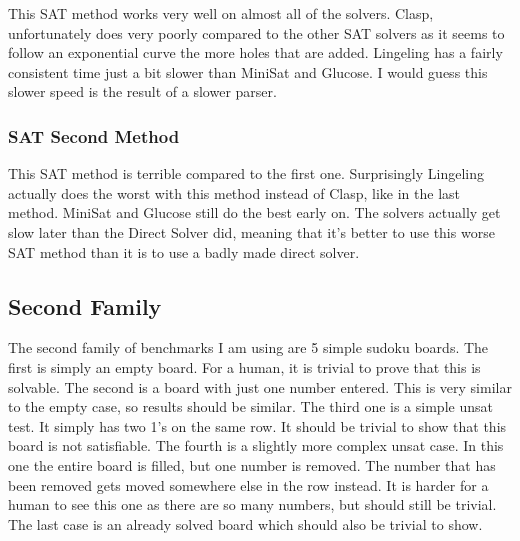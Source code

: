 \documentclass[11pt]{article} %
\begin{document}
This SAT method works very well on almost all of the solvers. Clasp, unfortunately does very poorly compared to the other SAT solvers as it seems to follow an exponential curve the more holes that are added. Lingeling has a fairly consistent time just a bit slower than MiniSat and Glucose. I would guess this slower speed is the result of a slower parser.

\subsubsection{SAT Second Method}

This SAT method is terrible compared to the first one. Surprisingly Lingeling actually does the worst with this method instead of Clasp, like in the last method. MiniSat and Glucose still do the best early on. The solvers actually get slow later than the Direct Solver did, meaning that it's better to use this worse SAT method than it is to use a badly made direct solver.

\newpage

\subsection{Second Family}

The second family of benchmarks I am using are 5 simple sudoku boards. The first is simply an empty board. For a human, it is trivial to prove that this is solvable. The second is a board with just one number entered. This is very similar to the empty case, so results should be similar. The third one is a simple unsat test. It simply has two 1's on the same row. It should be trivial to show that this board is not satisfiable. The fourth is a slightly more complex unsat case. In this one the entire board is filled, but one number is removed. The number that has been removed gets moved somewhere else in the row instead. It is harder for a human to see this one as there are so many numbers, but should still be trivial. The last case is an already solved board which should also be trivial to show.
\end{document}
